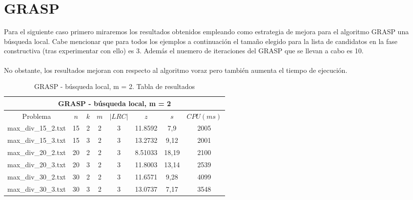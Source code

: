    
\clearpage
\section{GRASP}

Para el siguiente caso primero miraremos los resultados obtenidos empleando como estrategia de mejora para el algoritmo GRASP una búsqueda local. Cabe mencionar que para todos los ejemplos a continuación el tamaño elegido para la lista de candidatos en la fase constructiva (tras experimentar con ello) es 3. Además el nuemero de iteraciones del GRASP que se llevan a cabo es 10.
\\
\\
No obstante, los resultados mejoran con respecto al algoritmo voraz pero también aumenta el tiempo de ejecución.

   \begin{table}[h]
   {\small
   \begin{center}
   \begin{tabular}{cccccccc}
      \multicolumn{8}{c}{GRASP - búsqueda local, m = 2} \\
      \hline
      Problema & $n$ & $k$ & $m$ & $|LRC|$ & $z$ & $s$ & $CPU(ms)$ \\
      \hline
      max\_div\_15\_2.txt & 15 & 2 & 2 & 3 & 11.8592 & 7,9 & 2005 \\
      max\_div\_15\_3.txt & 15 & 3 & 2 & 3 & 13.2732 & 9,12 & 2001 \\
      max\_div\_20\_2.txt & 20 & 2 & 2 & 3 & 8.51033 & 18,19 & 2100 \\
      max\_div\_20\_3.txt & 20 & 3 & 2 & 3 & 11.8003 & 13,14 & 2539 \\
      max\_div\_30\_2.txt & 30 & 2 & 2 & 3 & 11.6571 & 9,28 & 4099 \\
      max\_div\_30\_3.txt & 30 & 3 & 2 & 3 & 13.0737 & 7,17 & 3548 \\
      \hline
   \end{tabular}
   \end{center}
   }
   \caption{GRASP - búsqueda local, m = 2. Tabla de resultados}
   \end{table}

